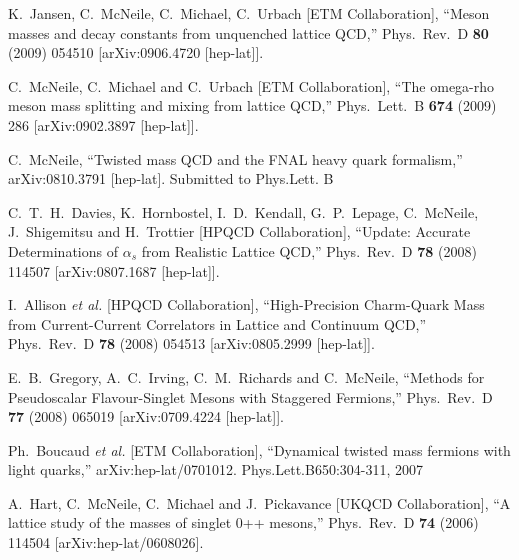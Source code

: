 \begin{thebibliography}{130}
  K.~Jansen, C.~McNeile, C.~Michael, C.~Urbach
 [ETM Collaboration],
  ``Meson masses and decay constants from unquenched lattice QCD,''
  Phys.\ Rev.\  D {\bf 80} (2009) 054510
  [arXiv:0906.4720 [hep-lat]].


  C.~McNeile, C.~Michael and C.~Urbach  [ETM Collaboration],
  ``The omega-rho meson mass splitting and mixing from lattice QCD,''
  Phys.\ Lett.\  B {\bf 674} (2009) 286
  [arXiv:0902.3897 [hep-lat]].

  C.~McNeile,
  ``Twisted mass QCD and the FNAL heavy quark formalism,''
  arXiv:0810.3791 [hep-lat]. Submitted to Phys.Lett. B


  C.~T.~H.~Davies, K.~Hornbostel, I.~D.~Kendall, G.~P.~Lepage,
  C.~McNeile, J.~Shigemitsu and H.~Trottier
                  [HPQCD Collaboration],
  ``Update: Accurate Determinations of $\alpha_s$ from Realistic
  Lattice QCD,''
  Phys.\ Rev.\  D {\bf 78} (2008) 114507
  [arXiv:0807.1687 [hep-lat]].


  I.~Allison {\it et al.}  [HPQCD Collaboration],
  ``High-Precision Charm-Quark Mass from Current-Current Correlators
  in Lattice
  and Continuum QCD,''
  Phys.\ Rev.\  D {\bf 78} (2008) 054513
  [arXiv:0805.2999 [hep-lat]].


  E.~B.~Gregory, A.~C.~Irving, C.~M.~Richards and C.~McNeile,
  ``Methods for Pseudoscalar Flavour-Singlet Mesons with Staggered Fermions,''
Phys.\ Rev.\  D {\bf 77} (2008) 065019
  [arXiv:0709.4224 [hep-lat]].

  Ph.~Boucaud {\it et al.}  [ETM Collaboration],
  ``Dynamical twisted mass fermions with light quarks,''
  arXiv:hep-lat/0701012. Phys.Lett.B650:304-311, 2007

  A.~Hart, C.~McNeile, C.~Michael and J.~Pickavance  [UKQCD Collaboration],
  ``A lattice study of the masses of singlet 0++ mesons,''
  Phys.\ Rev.\ D {\bf 74} (2006) 114504
[arXiv:hep-lat/0608026].


\end{thebibliography}
